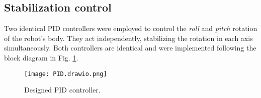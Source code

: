 \documentclass[conference]{IEEEtran}
\begin{document}

\subsection{Stabilization control}

Two identical PID controllers were employed to control the \textit{roll} and \textit{pitch} rotation of the robot's body. They act independently, stabilizing the rotation in each axis simultaneously. Both controllers are identical and were implemented following the block diagram in Fig. \ref{fig:pid}.

\begin{figure}[htbp]
  \centering
  \texttt{[image: PID.drawio.png]}
  \caption{Designed PID controller.}
  \label{fig:pid}
\end{figure}
\end{document}
